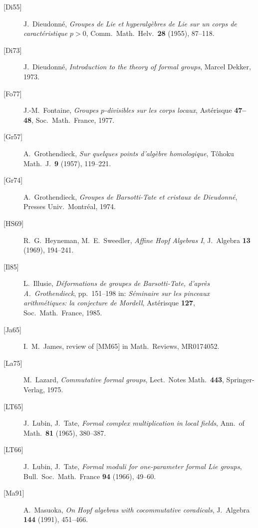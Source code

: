 \begin{description}
  \item[\textup{[Di55]}] J.~Dieudonn\'e,
  \emph{Groupes de Lie et hyperalg\`ebres de Lie sur un corps
  de caract\'eristique \(p>0\)}, Comm.\ Math.\ Helv.\
  \textbf{28} (1955), 87--118.

  \item[\textup{[Di73]}] J.~Dieudonn\'e,
  \emph{Introduction to the theory of formal groups},
  Marcel Dekker, 1973.

  \item[\textup{[Fo77]}] J.-M.~Fontaine,
  \emph{Groupes \(p\)-divisibles sur les corps locaux},
  Ast\'erisque \textbf{47--48}, Soc.\ Math.\ France, 1977.

  \item[\textup{[Gr57]}] A.~Grothendieck,
  \emph{Sur quelques points d'alg\`ebre homologique},
  T\^ohoku Math.\ J.\ \textbf{9} (1957), 119--221.

  \item[\textup{[Gr74]}] A.~Grothendieck,
  \emph{Groupes de Barsotti-Tate et cristaux de Dieudonn\'e},
  Presses Univ.\ Montr\'eal, 1974.

  \item[\textup{[HS69]}] R.~G.~Heyneman, M.~E.~Sweedler,
  \emph{Affine Hopf Algebras I}, J.\ Algebra \textbf{13}
  (1969), 194--241.

  \item[\textup{[Il85]}] L.~Illusie,
  \emph{D\'eformations de groupes de Barsotti-Tate, d'apr\`es
  A.~Grothendieck}, pp.~151--198 in:
  \emph{S\'eminaire sur les pinceaux arithm\'etiques: la
  conjecture de Mordell}, Ast\'erisque \textbf{127},
  Soc.\ Math.\ France, 1985.

  \item[\textup{[Ja65]}] I.~M.~James,
  review of \textup{[MM65]} in Math.\ Reviews, MR0174052.

  \item[\textup{[La75]}] M.~Lazard,
  \emph{Commutative formal groups},
  Lect.\ Notes Math.\ \textbf{443}, Springer-Verlag, 1975.

  \item[\textup{[LT65]}] J.~Lubin, J.~Tate,
  \emph{Formal complex multiplication in local fields},
  Ann.\ of Math.\ \textbf{81} (1965), 380--387.

  \item[\textup{[LT66]}] J.~Lubin, J.~Tate,
  \emph{Formal moduli for one-parameter formal Lie groups},
  Bull.\ Soc.\ Math.\ France \textbf{94} (1966), 49--60.

  \item[\textup{[Ma91]}] A.~Masuoka,
  \emph{On Hopf algebras with cocommutative coradicals},
  J.\ Algebra \textbf{144} (1991), 451--466.


\end{description}
